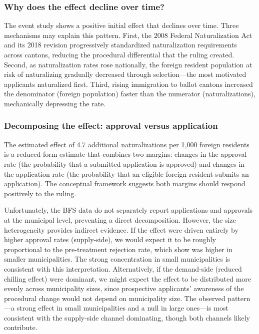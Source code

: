 \documentclass[12pt]{article}
\begin{document}
\subsubsection*{Why does the effect decline over time?} The event study shows a positive initial effect that declines over time. Three mechanisms may explain this pattern. First, the 2008 Federal Naturalization Act and its 2018 revision progressively standardized naturalization requirements across cantons, reducing the procedural differential that the ruling created. Second, as naturalization rates rose nationally, the foreign resident population at risk of naturalizing gradually decreased through selection---the most motivated applicants naturalized first. Third, rising immigration to ballot cantons increased the denominator (foreign population) faster than the numerator (naturalizations), mechanically depressing the rate.

\subsubsection*{Decomposing the effect: approval versus application} The estimated effect of 4.7 additional naturalizations per 1,000 foreign residents is a reduced-form estimate that combines two margins: changes in the approval rate (the probability that a submitted application is approved) and changes in the application rate (the probability that an eligible foreign resident submits an application). The conceptual framework suggests both margins should respond positively to the ruling.

Unfortunately, the BFS data do not separately report applications and approvals at the municipal level, preventing a direct decomposition. However, the size heterogeneity provides indirect evidence. If the effect were driven entirely by higher approval rates (supply-side), we would expect it to be roughly proportional to the pre-treatment rejection rate, which \citet{hainmueller2013} show was higher in smaller municipalities. The strong concentration in small municipalities is consistent with this interpretation. Alternatively, if the demand-side (reduced chilling effect) were dominant, we might expect the effect to be distributed more evenly across municipality sizes, since prospective applicants' awareness of the procedural change would not depend on municipality size. The observed pattern---a strong effect in small municipalities and a null in large ones---is most consistent with the supply-side channel dominating, though both channels likely contribute.
\end{document}
